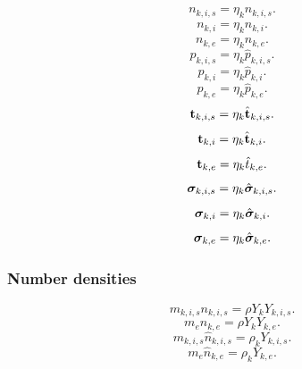 \documentclass[a4paper,11pt]{report}
\begin{document}
\begin{equation}
    n_{k,i,s} = \eta_k \hat{n}_{k,i,s}.
\end{equation}
\begin{equation}
    n_{k,i} = \eta_k \hat{n}_{k,i}.
\end{equation}
\begin{equation}
    n_{k,e} = \eta_k \hat{n}_{k,e}.
\end{equation}
\begin{equation}
    p_{k,i,s} = \eta_k \hat{p}_{k,i,s}.
\end{equation}
\begin{equation}
    p_{k,i} = \eta_k \hat{p}_{k,i}.
\end{equation}
\begin{equation}
    p_{k,e} = \eta_k \hat{p}_{k,e}.
\end{equation}
\begin{equation}
    \mathbf{t}_{k,i,s} = \eta_k \hat{\mathbf{t}}_{k,i,s}.
\end{equation}
\begin{equation}
    \mathbf{t}_{k,i} = \eta_k \hat{\mathbf{t}}_{k,i}.
\end{equation}
\begin{equation}
    \mathbf{t}_{k,e} = \eta_k \hat{t}_{k,e}.
\end{equation}
\begin{equation}
    \bm \sigma_{k,i,s} = \eta_k \hat{\bm \sigma}_{k,i,s}.
\end{equation}
\begin{equation}
    \bm \sigma_{k,i} = \eta_k \hat{\bm \sigma}_{k,i}.
\end{equation}
\begin{equation}
    \bm \sigma_{k,e} = \eta_k \hat{\bm \sigma}_{k,e}.
\end{equation}

\subsubsection{Number densities}
\begin{equation}
    \label{eq:mm_mass_number_densities_i}
    m_{k,i,s} n_{k,i,s} = \rho Y_k Y_{k,i,s}.
\end{equation}
\begin{equation}
    \label{eq:mm_mass_number_densities_e}
    m_e n_{k,e} = \rho Y_k Y_{k,e}.
\end{equation}
\begin{equation}
    \label{eq:mm_mass_number_densities_i_hat}
    m_{k,i,s} \hat{n}_{k,i,s} = \rho_k Y_{k,i,s}.
\end{equation}
\begin{equation}
    \label{eq:mm_mass_number_densities_e_hat}
    m_e \hat{n}_{k,e} = \rho_k Y_{k,e}.
\end{equation}
\end{document}
